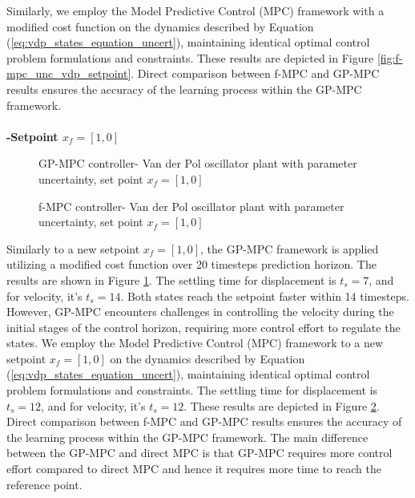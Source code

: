 Similarly, we employ the Model Predictive Control (MPC) framework with a modified cost function on the dynamics described by Equation (\ref{eq:vdp_states_equation_uncert}), maintaining identical optimal control problem formulations and constraints. These results are depicted in Figure \ref{fig:f-mpc_unc_vdp_setpoint}. Direct comparison between f-MPC and GP-MPC results ensures the accuracy of the learning process within the GP-MPC framework.
\\
\\
\textbf{-Setpoint $x_f= [1,0]$}

\begin{figure}
    \centering
    
    \caption{GP-MPC controller- Van der Pol oscillator plant with parameter uncertainty, set point $x_f= [1,0]$}
    \label{fig:Gp-mpc_unc_vdp_setpoint_1}
\end{figure}


\begin{figure}
    \centering
    
    \caption{f-MPC controller- Van der Pol oscillator plant with parameter uncertainty, set point $x_f= [1,0]$}
    \label{fig:f-mpc_unc_vdp_setpoint_1}
\end{figure}

Similarly to a new setpoint $x_f= [1,0]$, the GP-MPC framework is applied utilizing a modified cost function over 20 timesteps prediction horizon. The results are shown in Figure \ref{fig:Gp-mpc_unc_vdp_setpoint_1}. The settling time for displacement is $t_s=7$, and for velocity, it's $t_s=14$. Both states reach the setpoint faster within 14 timesteps. However, GP-MPC encounters challenges in controlling the velocity during the initial stages of the control horizon, requiring more control effort to regulate the states. We employ the Model Predictive Control (MPC) framework to a new setpoint $x_f= [1,0]$ on the dynamics described by Equation (\ref{eq:vdp_states_equation_uncert}), maintaining identical optimal control problem formulations and constraints. The settling time for displacement is $t_s=12$, and for velocity, it's $t_s=12$. These results are depicted in Figure \ref{fig:f-mpc_unc_vdp_setpoint_1}. Direct comparison between f-MPC and GP-MPC results ensures the accuracy of the learning process within the GP-MPC framework. The main difference between the GP-MPC and direct MPC is that GP-MPC requires more control effort compared to direct MPC and hence it requires more time to reach the reference point. 



